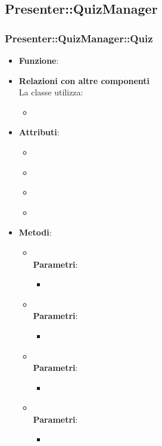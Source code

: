 \subsection{Presenter::QuizManager}
\subsubsection{Presenter::QuizManager::Quiz}
\begin{itemize}
\item\textbf{Funzione}:
\item\textbf{Relazioni con altre componenti}\\
La classe utilizza:
	\begin{itemize}
		\item
	\end{itemize}
\item\textbf{Attributi}:
	\begin{itemize}
		\item\code{}\\
		\item\code{}\\
		\item\code{}\\
		\item\code{}\\
	\end{itemize}
\item\textbf{Metodi}:
	\begin{itemize}
		\item\code{}\\
		\textbf{Parametri}:
			\begin{itemize}
				\item\code{}\\
			\end{itemize}
		\item\code{}\\
		\textbf{Parametri}:
			\begin{itemize}
				\item\code{}\\
			\end{itemize}
		\item\code{}\\
		\textbf{Parametri}:
			\begin{itemize}
				\item\code{}\\
			\end{itemize}
		\item\code{}\\
		\textbf{Parametri}:
			\begin{itemize}
				\item\code{}\\
			\end{itemize}
	\end{itemize}
\end{itemize}

